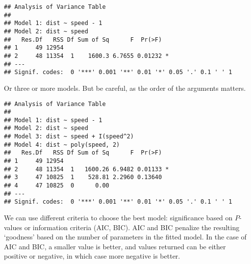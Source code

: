 \begin{knitrout}
\color{fgcolor}\begin{kframe}
\begin{alltt}
\end{alltt}
\begin{verbatim}
## Analysis of Variance Table
## 
## Model 1: dist ~ speed - 1
## Model 2: dist ~ speed
##   Res.Df   RSS Df Sum of Sq      F  Pr(>F)  
## 1     49 12954                              
## 2     48 11354  1    1600.3 6.7655 0.01232 *
## ---
## Signif. codes:  0 '***' 0.001 '**' 0.01 '*' 0.05 '.' 0.1 ' ' 1
\end{verbatim}
\end{kframe}
\end{knitrout}

Or three or more models. But be careful, as the order of the arguments matters.

\begin{knitrout}
\color{fgcolor}\begin{kframe}
\begin{alltt}
\end{alltt}
\begin{verbatim}
## Analysis of Variance Table
## 
## Model 1: dist ~ speed - 1
## Model 2: dist ~ speed
## Model 3: dist ~ speed + I(speed^2)
## Model 4: dist ~ poly(speed, 2)
##   Res.Df   RSS Df Sum of Sq      F  Pr(>F)  
## 1     49 12954                              
## 2     48 11354  1   1600.26 6.9482 0.01133 *
## 3     47 10825  1    528.81 2.2960 0.13640  
## 4     47 10825  0      0.00                 
## ---
## Signif. codes:  0 '***' 0.001 '**' 0.01 '*' 0.05 '.' 0.1 ' ' 1
\end{verbatim}
\end{kframe}
\end{knitrout}

We can use different criteria to choose the best model: significance based on $P$-values or information criteria (AIC, BIC). AIC and BIC penalize the resulting `goodness' based on the number of parameters in the fitted model. In the case of AIC and BIC, a smaller value is better, and values returned can be either positive or negative, in which case more negative is better.

